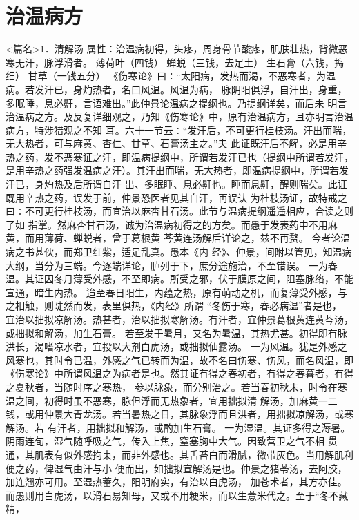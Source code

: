 \documentclass[a4paper,12pt,UTF8,twoside]{ctexbook}
\begin{document}
\chapter{治温病方}
<篇名>1．清解汤
属性：治温病初得，头疼，周身骨节酸疼，肌肤壮热，背微恶寒无汗，脉浮滑者。 
薄荷叶（四钱） 蝉蜕（三钱，去足土） 生石膏（六钱，捣细） 甘草（一钱五分） 
《伤寒论》曰∶“太阳病，发热而渴，不恶寒者，为温病。若发汗已，身灼热者，名曰风温。风温为病， 
脉阴阳俱浮，自汗出，身重，多眠睡，息必鼾，言语难出。”此仲景论温病之提纲也。乃提纲详矣，而后未 
明言治温病之方。及反复详细观之，乃知《伤寒论》中，原有治温病方，且亦明言治温病方，特涉猎观之不知 
耳。六十一节云∶“发汗后，不可更行桂枝汤。汗出而喘，无大热者，可与麻黄、杏仁、甘草、石膏汤主之。”夫 
此证既汗后不解，必是用辛热之药，发不恶寒证之汗，即温病提纲中，所谓若发汗已也（提纲中所谓若发汗， 
是用辛热之药强发温病之汗）。其汗出而喘，无大热者，即温病提纲中，所谓若发汗已，身灼热及后所谓自汗 
出、多眠睡、息必鼾也。睡而息鼾，醒则喘矣。此证既用辛热之药，误发于前，仲景恐医者见其自汗，再误认 
为桂枝汤证，故特戒之曰∶不可更行桂枝汤，而宜治以麻杏甘石汤。此节与温病提纲遥遥相应，合读之则了如 
指掌。然麻杏甘石汤，诚为治温病初得之的方矣。而愚于发表药中不用麻黄，而用薄荷、蝉蜕者，曾于葛根黄 
芩黄连汤解后详论之，兹不再赘。 
今者论温病之书甚伙，而郑卫红紫，适足乱真。愚本《内 
经》、仲景，间附以管见，知温病大纲，当分为三端。今逐端详论，胪列于下，庶分途施治，不至错误。 
一为春温。其证因冬月薄受外感，不至即病。所受之邪，伏于膜原之间，阻塞脉络，不能宣通，暗生内热。 
迨至春日阳生，内蕴之热，原有萌动之机，而复薄受外感，与之相触，则陡然而发，表里俱热，《内经》所谓 
“冬伤于寒，春必病温”者是也， 
宜治以拙拟凉解汤。热甚者，治以拙拟寒解汤。有汗者，宜仲景葛根黄连黄芩汤，或拙拟和解汤，加生石膏。 
若至发于暑月，又名为暑温，其热尤甚。初得即有脉洪长，渴嗜凉水者，宜投以大剂白虎汤，或拙拟仙露汤。 
一为风温。犹是外感之风寒也，其时令已温，外感之气已转而为温，故不名曰伤寒、伤风，而名风温，即 
《伤寒论》中所谓风温之为病者是也。然其证有得之春初者，有得之春暮者，有得之夏秋者，当随时序之寒热， 
参以脉象，而分别治之。若当春初秋末，时令在寒温之间，初得时虽不恶寒，脉但浮而无热象者，宜用拙拟清 
解汤，加麻黄一二钱，或用仲景大青龙汤。若当暑热之日，其脉象浮而且洪者，用拙拟凉解汤，或寒解汤。若 
有汗者，用拙拟和解汤，或酌加生石膏。 
一为湿温。其证多得之溽暑。阴雨连旬，湿气随呼吸之气，传入上焦，窒塞胸中大气。因致营卫之气不相 
贯通，其肌表有似外感拘束，而非外感也。其舌苔白而滑腻，微带灰色。当用解肌利便之药，俾湿气由汗与小 
便而出，如拙拟宣解汤是也。仲景之猪苓汤，去阿胶，加连翘亦可用。至湿热蓄久，阳明府实，有治以白虎汤， 
加苍术者，其方亦佳。而愚则用白虎汤，以滑石易知母，又或不用粳米，而以生薏米代之。至于“冬不藏精， 
\end{document}
